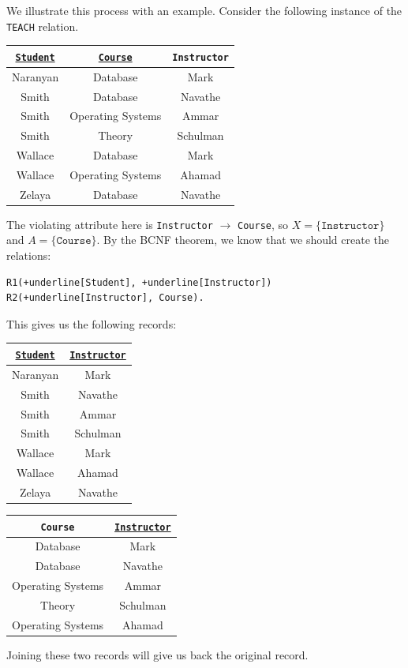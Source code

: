 \documentclass[a4paper, openany]{memoir}
\begin{document}
We illustrate this process with an example. Consider the following instance of the \texttt{TEACH} relation.
\begin{table}[H]
    \centering
    \begin{tabular}{|c|c|c|}
        \hline
        \texttt{\underline{Student}} & \texttt{\underline{Course}} & \texttt{Instructor} \\
        \hline
        Naranyan & Database & Mark \\
        Smith & Database & Navathe \\
        Smith & Operating Systems & Ammar \\
        Smith & Theory & Schulman \\
        Wallace & Database & Mark \\
        Wallace & Operating Systems & Ahamad \\
        Zelaya & Database & Navathe \\
        \hline
    \end{tabular}
\end{table}
\noindent The violating attribute here is \texttt{Instructor} $\to$ \texttt{Course}, so $X = \{\texttt{Instructor}\}$ and $A = \{\texttt{Course}\}$. By the BCNF theorem, we know that we should create the relations:
\begin{Verbatim}[commandchars=+\[\]]
R1(+underline[Student], +underline[Instructor])
R2(+underline[Instructor], Course).
\end{Verbatim}
This gives us the following records:
\begin{table}[H]
    \centering
    \begin{tabular}{|c|c|}
        \hline
        \texttt{\underline{Student}} & \texttt{\underline{Instructor}} \\
        \hline
        Naranyan & Mark \\
        Smith & Navathe \\
        Smith & Ammar \\
        Smith & Schulman \\
        Wallace & Mark \\
        Wallace & Ahamad \\
        Zelaya & Navathe \\
        \hline
    \end{tabular}
\end{table}
\begin{table}[H]
    \centering
    \begin{tabular}{|c|c|}
        \hline
        \texttt{Course} & \texttt{\underline{Instructor}} \\
        \hline
        Database & Mark \\
        Database & Navathe \\
        Operating Systems & Ammar \\
        Theory & Schulman \\
        Operating Systems & Ahamad \\
        \hline
    \end{tabular}
\end{table}
\noindent Joining these two records will give us back the original record.
\end{document}
